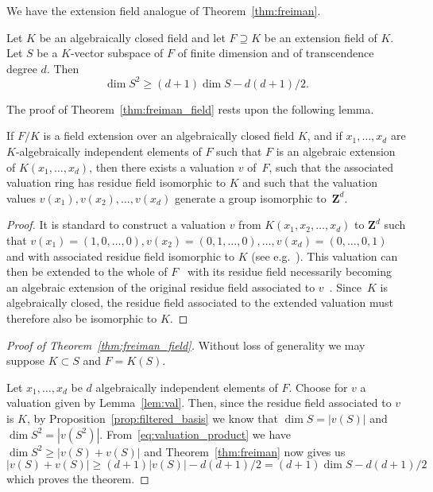 \documentclass[ALCO,Unicode,ThmDefs]{cedram}
\newcommand*\Z{{\mathbf Z}}
\renewcommand{\geq}{\geqslant}
\begin{document}
We have the extension field analogue of Theorem~\ref{thm:freiman}.

\begin{theo}\label{thm:freiman_field}
Let $K$ be {an algebraically closed} field and let $F \supseteq K$ be an extension field of $K$. Let $S$ be a $K$-vector subspace of $F$ of finite dimension and of transcendence degree $d$. Then
\[
\dim S^2\geq(d+1)\dim S -d(d+1)/2.
\]
\end{theo}

The proof of Theorem~\ref{thm:freiman_field} rests upon the following lemma.

\begin{lemm}\label{lem:val}
If $F/K$ is a field extension over an algebraically closed field $K$, and if $x_1,\ldots,x_d$ are $K$-algebraically independent elements of $F$ such that $F$ is an algebraic extension of $K(x_1,\ldots,x_d)$, then there exists a valuation $v$ of~$F$, such that the associated valuation ring has residue field isomorphic to $K$ and such that the valuation values $v(x_1),v(x_2),\ldots,v(x_d)$ generate a group isomorphic to~$\Z^d$.
\end{lemm}

\begin{proof}
It is standard to construct a valuation $v$ from $K(x_1,x_2,\ldots ,x_d)$ to $\Z^d$ such that $v(x_1)=(1,0,\ldots,0), v(x_2)=(0,1,\ldots,0),\ldots, v(x_d)=(0,\ldots,0,1)$ and with associated residue field isomorphic to $K$ (see e.g.~\cite[Chapter~6, \S 3.4, Example~6]{Bourbaki_AlgComm5-6}). This valuation can then be extended to the whole of $F$~\cite[Chapter~6, \S 3.3, Proposition~5]{Bourbaki_AlgComm5-6} with its residue field necessarily becoming an algebraic extension of the original residue field associated to $v$~\cite[Chapter~6, \S 8.1, Proposition~1]{Bourbaki_AlgComm5-6}. Since~$K$ is algebraically closed, the residue field associated to the extended valuation must therefore also be isomorphic to $K$.
\end{proof}

\begin{proof}[Proof of Theorem~\ref{thm:freiman_field}]
Without loss of generality we may suppose $K\subset S$ and $F=K(S)$.

Let $x_1,\ldots,x_d$ be $d$ algebraically independent elements of $F$. Choose for $v$ a valuation given by Lemma~\ref{lem:val}. Then, since the residue field associated to $v$ is $K$, by Proposition~\ref{prop:filtered_basis} we know that $\dim S=|v(S)|$ and $\dim S^2=|v(S^2)|$. From~\eqref{eq:valuation_product} we have $\dim S^2\geq|v(S)+v(S)|$ and Theorem~\ref{thm:freiman} now gives us
\[
|v(S)+v(S)|\geq(d+1)|v(S)|-d(d+1)/2=(d+1)\dim S-d(d+1)/2
\]
which proves the theorem.
\end{proof}
\end{document}
